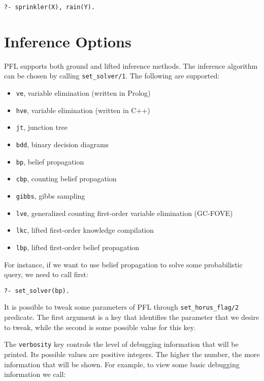 \documentclass{article}
\begin{document}
\texttt{?- sprinkler(X), rain(Y).}


\section{Inference Options}
PFL supports both ground and lifted inference methods. The inference algorithm can be chosen by calling \texttt{set\_solver/1}. The following are supported:
\begin{itemize}
 \item \texttt{ve},  variable elimination (written in Prolog)
 \item \texttt{hve}, variable elimination (written in C++)
 \item \texttt{jt},  junction tree
 \item \texttt{bdd}, binary decision diagrams
 \item \texttt{bp},  belief propagation
 \item \texttt{cbp}, counting belief propagation
 \item \texttt{gibbs}, gibbs sampling
 \item \texttt{lve}, generalized counting first-order variable elimination (GC-FOVE)
 \item \texttt{lkc}, lifted first-order knowledge compilation
 \item \texttt{lbp}, lifted first-order belief propagation
\end{itemize}

For instance, if we want to use belief propagation to solve some probabilistic query, we need to call first:

\texttt{?- set\_solver(bp).}

It is possible to tweak some parameters of PFL through \texttt{set\_horus\_flag/2} predicate. The first argument is a key that identifies the parameter that we desire to tweak, while the second is some possible value for this key.

The \texttt{verbosity} key controls the level of debugging information that will be printed. Its possible values are positive integers. The higher the number, the more information that will be shown. For example, to view some basic debugging information we call:
\end{document}
